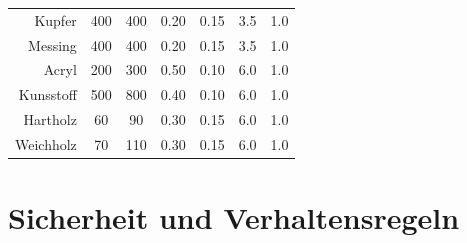 \documentclass{\basedir/fablab-document}
\begin{document}
\begin{tabular}{rcccccc}
	Kupfer											& 400	 	& 400  	& 0.20 	& 0.15	& 3.5 	& 1.0 	\\
	Messing											& 400	 	& 400  	& 0.20 	& 0.15	& 3.5 	& 1.0 	\\
	Acryl												& 200	 	& 300 	& 0.50 	& 0.10	& 6.0 	& 1.0 	\\
	Kunsstoff										& 500	 	& 800 	& 0.40 	& 0.10	& 6.0 	& 1.0 	\\
	Hartholz										& 60	 	& 90  	& 0.30 	& 0.15	& 6.0 	& 1.0 	\\
	Weichholz										& 70	 	& 110  	& 0.30 	& 0.15	& 6.0 	& 1.0 	\\
\end{tabular}


\newpage
\section{Sicherheit und Verhaltensregeln}
\end{document}
